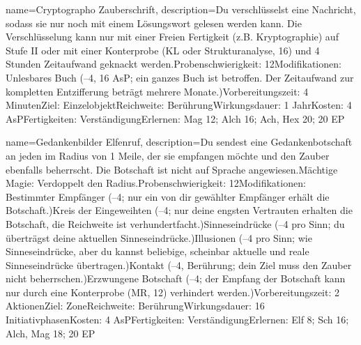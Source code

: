 {
    name={Cryptographo Zauberschrift},
    description={Du verschlüsselst eine Nachricht, sodass sie nur noch mit einem Lösungswort gelesen werden kann. Die Verschlüsselung kann nur mit einer Freien Fertigkeit (z.B. Kryptographie) auf Stufe II oder mit einer Konterprobe (KL oder Strukturanalyse, 16) und 4 Stunden Zeitaufwand geknackt werden.\newline Probenschwierigkeit: 12\newline Modifikationen: Unlesbares Buch (–4, 16 AsP; ein ganzes Buch ist betroffen. Der Zeitaufwand zur kompletten Entzifferung beträgt mehrere Monate.)\newline Vorbereitungszeit: 4 Minuten\newline Ziel: Einzelobjekt\newline Reichweite: Berührung\newline Wirkungsdauer: 1 Jahr\newline Kosten: 4 AsP\newline Fertigkeiten: Verständigung\newline Erlernen: Mag 12; Alch 16; Ach, Hex 20; 20 EP}
}


{
    name={Gedankenbilder Elfenruf},
    description={Du sendest eine Gedankenbotschaft an jeden im Radius von 1 Meile, der sie empfangen möchte und den Zauber ebenfalls beherrscht. Die Botschaft ist nicht auf Sprache angewiesen.\newline Mächtige Magie: Verdoppelt den Radius.\newline Probenschwierigkeit: 12\newline Modifikationen: Bestimmter Empfänger (–4; nur ein von dir gewählter Empfänger erhält die Botschaft.)\newline Kreis der Eingeweihten (–4; nur deine engsten Vertrauten erhalten die Botschaft, die Reichweite ist verhundertfacht.)\newline Sinneseindrücke (–4 pro Sinn; du überträgst deine aktuellen Sinneseindrücke.)\newline Illusionen (–4 pro Sinn; wie Sinneseindrücke, aber du kannst beliebige, scheinbar aktuelle und reale Sinneseindrücke übertragen.)\newline Kontakt (–4, Berührung; dein Ziel muss den Zauber nicht beherrschen.)\newline Erzwungene Botschaft (–4; der Empfang der Botschaft kann nur durch eine Konterprobe (MR, 12) verhindert werden.)\newline Vorbereitungszeit: 2 Aktionen\newline Ziel: Zone\newline Reichweite: Berührung\newline Wirkungsdauer: 16 Initiativphasen\newline Kosten: 4 AsP\newline Fertigkeiten: Verständigung\newline Erlernen: Elf 8; Sch 16; Alch, Mag 18; 20 EP}
}


